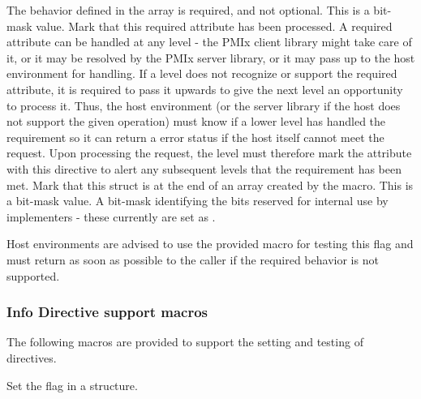 \begin{constantdesc}
%
The behavior defined in the  array is required, and not optional. This is a bit-mask value.
%
Mark that this required attribute has been processed. A required attribute can be handled at any level - the \ac{PMIx} client library might take care of it, or it may be resolved by the \ac{PMIx} server library, or it may pass up to the host environment for handling. If a level does not recognize or support the required attribute, it is required to pass it upwards to give the next level an opportunity to process it. Thus, the host environment (or the server library if the host does not support the given operation) must know if a lower level has handled the requirement so it can return a  error status if the host itself cannot meet the request. Upon processing the request, the level must therefore mark the attribute with this directive to alert any subsequent levels that the requirement has been met.
%
Mark that this  struct is at the end of an array created by the  macro. This is a bit-mask value.
%
A bit-mask identifying the bits reserved for internal use by implementers - these currently are set as .
%
\end{constantdesc}

\advicermstart
Host environments are advised to use the provided  macro for testing this flag and must return  as soon as possible to the caller if the required behavior is not supported.
\advicermend


\subsubsection{Info Directive support macros}

The following macros are provided to support the setting and testing of  directives.


Set the  flag in a  structure.


